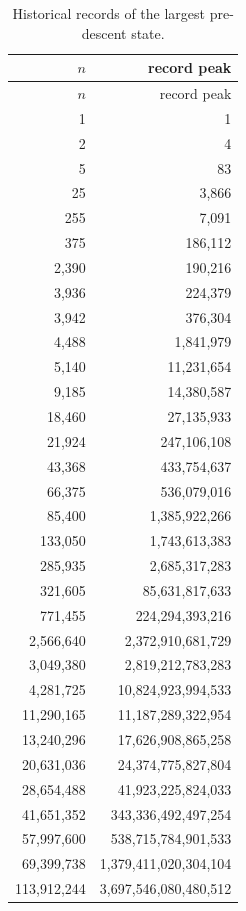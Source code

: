 \documentclass[11pt]{article}
\theoremstyle{definition}
\begin{document}
\begin{longtable}{r r}
\caption{Historical records of the largest pre-descent state.}\\
\toprule
$n$ & record peak\\
\midrule
\endfirsthead
\toprule
$n$ & record peak\\
\midrule
\endhead
1 & 1 \\
2 & 4 \\
5 & 83 \\
25 & 3{,}866 \\
255 & 7{,}091 \\
375 & 186{,}112 \\
2{,}390 & 190{,}216 \\
3{,}936 & 224{,}379 \\
3{,}942 & 376{,}304 \\
4{,}488 & 1{,}841{,}979 \\
5{,}140 & 11{,}231{,}654 \\
9{,}185 & 14{,}380{,}587 \\
18{,}460 & 27{,}135{,}933 \\
21{,}924 & 247{,}106{,}108 \\
43{,}368 & 433{,}754{,}637 \\
66{,}375 & 536{,}079{,}016 \\
85{,}400 & 1{,}385{,}922{,}266 \\
133{,}050 & 1{,}743{,}613{,}383 \\
285{,}935 & 2{,}685{,}317{,}283 \\
321{,}605 & 85{,}631{,}817{,}633 \\
771{,}455 & 224{,}294{,}393{,}216 \\
2{,}566{,}640 & 2{,}372{,}910{,}681{,}729 \\
3{,}049{,}380 & 2{,}819{,}212{,}783{,}283 \\
4{,}281{,}725 & 10{,}824{,}923{,}994{,}533 \\
11{,}290{,}165 & 11{,}187{,}289{,}322{,}954 \\
13{,}240{,}296 & 17{,}626{,}908{,}865{,}258 \\
20{,}631{,}036 & 24{,}374{,}775{,}827{,}804 \\
28{,}654{,}488 & 41{,}923{,}225{,}824{,}033 \\
41{,}651{,}352 & 343{,}336{,}492{,}497{,}254 \\
57{,}997{,}600 & 538{,}715{,}784{,}901{,}533 \\
69{,}399{,}738 & 1{,}379{,}411{,}020{,}304{,}104 \\
113{,}912{,}244 & 3{,}697{,}546{,}080{,}480{,}512 \\

\end{longtable}
\end{document}

